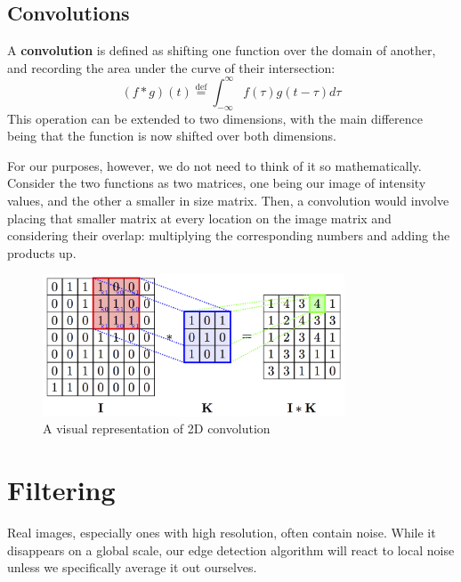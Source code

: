 \documentclass{article}
\begin{document}
\subsection{Convolutions}
A \textbf{convolution} is defined as shifting one function over the domain of another, and recording the area under the curve of their intersection:
\[( f * g ) ( t ) \stackrel { \mathrm { def } } { = } \int _ { - \infty } ^ { \infty } f ( \tau ) g ( t - \tau ) d \tau\]
This operation can be extended to two dimensions, with the main difference being that the function is now shifted over both dimensions.

For our purposes, however, we do not need to think of it so mathematically. Consider the two functions as two matrices, one being our image of intensity values, and the other a smaller in size matrix. Then, a convolution would involve placing that smaller matrix at every location on the image matrix and considering their overlap: multiplying the corresponding numbers and adding the products up.
\begin{figure}[!htb]
    \begin{center}
        \includegraphics[width=0.8\textwidth]{2d_convolution.png}
        \vspace{-10pt}
    \end{center}
    \caption{A visual representation of 2D convolution}
\end{figure}

\section{Filtering}
Real images, especially ones with high resolution, often contain noise. While it disappears on a global scale, our edge detection algorithm will react to local noise unless we specifically average it out ourselves.
\end{document}
